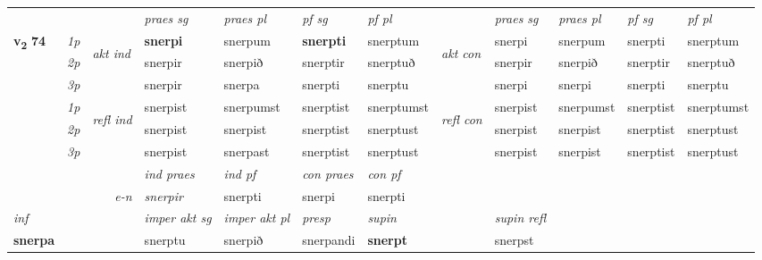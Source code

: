 \begin{longtable}[l]{X>{\footnotesize\itshape}llXXXXlXXXX}
 & &   & \textit{praes sg}  & \textit{praes pl}    & \textit{ pf sg} & \textit{pf pl} & & \textit{praes sg}  & \textit{praes pl}    & \textit{pf sg} & \textit{pf pl }  \\ \cmidrule{4-7} \cmidrule{9-12}
 \multirow{2}{*}{{{\textbf{v{\textsubscript{2}}} \Large{\textbf{74}}}}}  & 1p & \multirow{3}{*}{\begin{turn}{90}\textit{akt ind}\end{turn}} & \textbf{snerpi} & snerpum & \textbf{snerpti} & snerptum & \multirow{3}{*}{\begin{turn}{90}\textit{akt con}\end{turn}} &snerpi & snerpum & snerpti & snerptum\\*
 & 2p &  &  snerpir  & snerpið & snerptir & snerptuð & & snerpir & snerpið & snerptir & snerptuð \\*
 & 3p &  & snerpir & snerpa & snerpti & snerptu & & snerpi & snerpi& snerpti & snerptu \\*
\cmidrule{4-7} \cmidrule{9-12}
 & 1p & \multirow{3}{*}{\begin{turn}{90}\textit{refl ind}\end{turn}}  & snerpist & snerpumst & snerptist & snerptumst & \multirow{3}{*}{\begin{turn}{90}\textit{refl con}\end{turn}}  &snerpist & snerpumst & snerptist & snerptumst \\*
 & 2p &  & snerpist & snerpist & snerptist & snerptust & &snerpist & snerpist & snerptist & snerptust \\*
 & 3p  & & snerpist & snerpast & snerptist & snerptust & & snerpist & snerpist& snerptist & snerptust \\*
\cmidrule{4-7} \cmidrule{9-12}

   && &  \textit{ind praes} & \textit{ind pf} & \textit{con praes} & \textit{con pf} \\*
\multicolumn{3}{r}{\textit{e-n}} & snerpir & snerpti & snerpi & snerpti \\*

\cmidrule{4-7}
   {\textit{inf}} & &  & \textit{imper akt sg} & \textit{imper akt pl}   & \textit{presp} & \textit{supin} && \textit{supin refl}  \\*
  {\textbf{snerpa}} & && snerptu  & snerpið   & snerpandi &  \textbf{snerpt} && snerpst  \\*

\midrule


\end{longtable}
